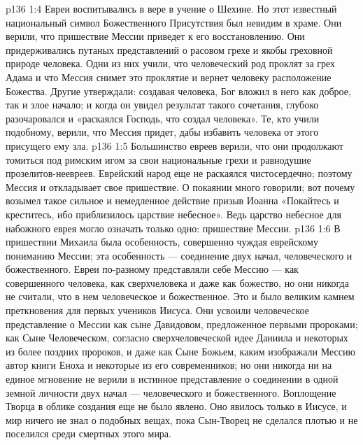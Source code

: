 \vs p136 1:4 \pc Евреи воспитывались в вере в учение о Шехине. Но этот известный национальный символ Божественного Присутствия был невидим в храме. Они верили, что пришествие Мессии приведет к его восстановлению. Они придерживались путаных представлений о расовом грехе и якобы греховной природе человека. Одни из них учили, что человеческий род проклят за грех Адама и что Мессия снимет это проклятие и вернет человеку расположение Божества. Другие утверждали: создавая человека, Бог вложил в него как доброе, так и злое начало; и когда он увидел результат такого сочетания, глубоко разочаровался и «раскаялся Господь, что создал человека». Те, кто учили подобному, верили, что Мессия придет, дабы избавить человека от этого присущего ему зла.
\vs p136 1:5 Большинство евреев верили, что они продолжают томиться под римским игом за свои национальные грехи и равнодушие прозелитов\hyp{}неевреев. Еврейский народ еще не раскаялся чистосердечно; поэтому Мессия и откладывает свое пришествие. О покаянии много говорили; вот почему возымел такое сильное и немедленное действие призыв Иоанна «Покайтесь и креститесь, ибо приблизилось царствие небесное». Ведь царство небесное для набожного еврея могло означать только одно: пришествие Мессии.
\vs p136 1:6 В пришествии Михаила была особенность, совершенно чуждая еврейскому пониманию Мессии; эта особенность --- соединение двух начал, человеческого и божественного. Евреи по\hyp{}разному представляли себе Мессию --- как совершенного человека, как сверхчеловека и даже как божество, но они никогда не считали, что в нем  человеческое и божественное. Это и было великим камнем преткновения для первых учеников Иисуса. Они усвоили человеческое представление о Мессии как сыне Давидовом, предложенное первыми пророками; как Сыне Человеческом, согласно сверхчеловеческой идее Даниила и некоторых из более поздних пророков, и даже как Сыне Божьем, каким изображали Мессию автор книги Еноха и некоторые из его современников; но они никогда ни на единое мгновение не верили в истинное представление о соединении в одной земной личности двух начал --- человеческого и божественного. Воплощение Творца в облике создания еще не было явлено. Оно явилось только в Иисусе, и мир ничего не знал о подобных вещах, пока Сын\hyp{}Творец не сделался плотью и не поселился среди смертных этого мира.
